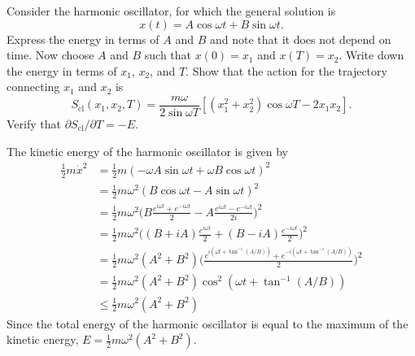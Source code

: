 \documentclass[../principles-of-quantum-mechanics.tex]{subfiles}
\begin{document}
\begin{questions}
		\question Consider the harmonic oscillator, for which the general solution is
		\[
			x(t) = A\cos\omega t + B\sin\omega t.
		\]
		Express the energy in terms of $A$ and $B$ and note that it does not depend on time. Now choose $A$ and $B$ such that $x(0) = x_1$ and $x(T) = x_2$. Write down the energy in terms of $x_1$, $x_2$, and $T$. Show that the action for the trajectory connecting $x_1$ and $x_2$ is
		\[
			S_{\text{cl}}(x_1, x_2, T) = \frac{m\omega}{2\sin\omega T}[(x_1^2+x_2^2)\cos\omega T - 2x_1x_2].
		\]
		Verify that $\partial S_{\text{cl}}/\partial T = -E$.
		
		\begin{solution}
			The kinetic energy of the harmonic oscillator is given by
			\begin{align*}
				\frac{1}{2}m\dot{x}^2 &= \frac{1}{2}m(-\omega A\sin\omega t + \omega B\cos\omega t)^2 \\
				&= \frac{1}{2}m\omega^2(B\cos\omega t - A\sin\omega t)^2 \\
				&= \frac{1}{2}m\omega^2\Big(B\frac{e^{i\omega t} + e^{-i\omega t}}{2} - A\frac{e^{i \omega t} - e^{-i\omega t}}{2i}\Big)^2 \\
				&= \frac{1}{2}m\omega^2\Big((B + iA)\frac{e^{i\omega t}}{2} + (B - iA)\frac{e^{-i\omega t}}{2}\Big)^2 \\
				&= \frac{1}{2}m\omega^2(A^2 + B^2)\Big(\frac{e^{i(\omega t + \tan^{-1}(A/B))} + e^{-i(\omega t + \tan^{-1}(A/B))}}{2}\Big)^2 \\
				&= \frac{1}{2}m\omega^2(A^2+B^2)\cos^2(\omega t + \tan^{-1}(A/B)) \\
				&\leq \frac{1}{2}m\omega^2(A^2+B^2)
			\end{align*}
			Since the total energy of the harmonic oscillator is equal to the maximum of the kinetic energy, $E = \frac{1}{2}m\omega^2(A^2+B^2)$.
			

\end{solution}
\end{questions}
\end{document}
